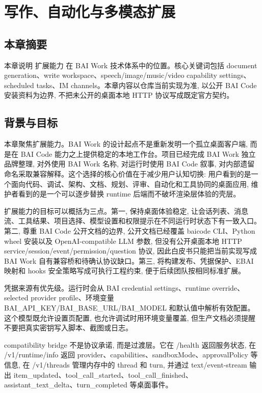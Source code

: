 \chapter{写作、自动化与多模态扩展}
\section{本章摘要}
本章说明 扩展能力 在 BAI Work 技术体系中的位置。核心关键词包括 document generation、write workspace、speech/image/music/video capability settings、scheduled tasks、IM channels。本章内容以仓库当前实现为准, 以公开 BAI Code 安装资料为边界, 不把未公开的桌面本地 HTTP 协议写成既定官方契约。

\section{背景与目标}
本章聚焦扩展能力。BAI Work 的设计起点不是重新发明一个孤立桌面客户端, 而是在 BAI Code 能力之上提供稳定的本地工作台。项目已经完成 BAI Work 独立品牌整理, 对外使用 BAI Work 名称, 对运行时使用 BAI Code 叙事, 对内部遗留命名采取兼容解释。这个选择的核心价值在于减少用户认知切换: 用户看到的是一个面向代码、调试、架构、文档、规划、评审、自动化和工具协同的桌面应用, 维护者看到的是一个可以逐步替换 runtime 后端而不破坏渲染层体验的壳层。

扩展能力的目标可以概括为三点。第一, 保持桌面体验稳定, 让会话列表、消息流、工具结果、项目选择、模型设置和权限提示在不同运行时状态下有一致入口。第二, 尊重 BAI Code 公开文档的边界, 公开文档已经覆盖 baicode CLI、Python wheel 安装以及 OpenAI-compatible LLM 参数, 但没有公开桌面本地 HTTP service/session/event/permission/question 协议, 因此白皮书只能把当前实现写成 BAI Work 自有兼容桥和待确认协议缺口。第三, 将构建发布、凭据保护、EBAI 映射和 hooks 安全策略写成可执行工程约束, 便于后续团队按相同标准扩展。

凭据来源有优先级。运行时会从 BAI credential settings、runtime override、selected provider profile、环境变量 BAI\_API\_KEY/BAI\_BASE\_URL/BAI\_MODEL 和默认值中解析有效配置。这个模型既允许设置页配置, 也允许调试时用环境变量覆盖, 但生产文档必须提醒不要把真实密钥写入脚本、截图或日志。

compatibility bridge 不是协议承诺, 而是过渡层。它在 /health 返回服务状态, 在 /v1/runtime/info 返回 provider、capabilities、sandboxMode、approvalPolicy 等信息, 在 /v1/threads 管理内存中的 thread 和 turn, 并通过 text/event-stream 输出 item\_updated、tool\_call\_started、tool\_call\_finished、assistant\_text\_delta、turn\_completed 等桌面事件。

